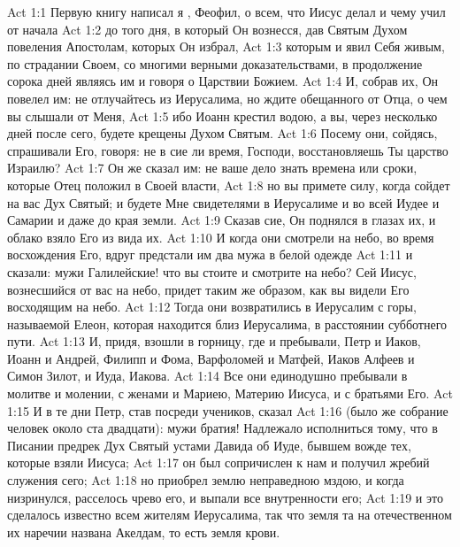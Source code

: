 \vs Act 1:1 Первую книгу написал я , Феофил, о всем, что Иисус делал и чему учил от начала
\vs Act 1:2 до того дня, в который Он вознесся, дав Святым Духом повеления Апостолам, которых Он избрал,
\vs Act 1:3 которым и явил Себя живым, по страдании Своем, со многими верными доказательствами, в продолжение сорока дней являясь им и говоря о Царствии Божием.
\rsbpar\vs Act 1:4 И, собрав их, Он повелел им: не отлучайтесь из Иерусалима, но ждите обещанного от Отца, о чем вы слышали от Меня,
\vs Act 1:5 ибо Иоанн крестил водою, а вы, через несколько дней после сего, будете крещены Духом Святым.
\vs Act 1:6 Посему они, сойдясь, спрашивали Его, говоря: не в сие ли время, Господи, восстановляешь Ты царство Израилю?
\vs Act 1:7 Он же сказал им: не ваше дело знать времена или сроки, которые Отец положил в Своей власти,
\vs Act 1:8 но вы примете силу, когда сойдет на вас Дух Святый; и будете Мне свидетелями в Иерусалиме и во всей Иудее и Самарии и даже до края земли.
\vs Act 1:9 Сказав сие, Он поднялся в глазах их, и облако взяло Его из вида их.
\vs Act 1:10 И когда они смотрели на небо, во время восхождения Его, вдруг предстали им два мужа в белой одежде
\vs Act 1:11 и сказали: мужи Галилейские! что вы стоите и смотрите на небо? Сей Иисус, вознесшийся от вас на небо, придет таким же образом, как вы видели Его восходящим на небо.
\rsbpar\vs Act 1:12 Тогда они возвратились в Иерусалим с горы, называемой Елеон, которая находится близ Иерусалима, в расстоянии субботнего пути.
\vs Act 1:13 И, придя, взошли в горницу, где и пребывали, Петр и Иаков, Иоанн и Андрей, Филипп и Фома, Варфоломей и Матфей, Иаков Алфеев и Симон Зилот, и Иуда,  Иакова.
\vs Act 1:14 Все они единодушно пребывали в молитве и молении, с  женами и Мариею, Материю Иисуса, и с братьями Его.
\rsbpar\vs Act 1:15 И в те дни Петр, став посреди учеников, сказал
\vs Act 1:16 (было же собрание человек около ста двадцати): мужи братия! Надлежало исполниться тому, что в Писании предрек Дух Святый устами Давида об Иуде, бывшем вожде тех, которые взяли Иисуса;
\vs Act 1:17 он был сопричислен к нам и получил жребий служения сего;
\vs Act 1:18 но приобрел землю неправедною мздою, и когда низринулся, расселось чрево его, и выпали все внутренности его;
\vs Act 1:19 и это сделалось известно всем жителям Иерусалима, так что земля та на отечественном их наречии названа Акелдам, то есть земля крови.
